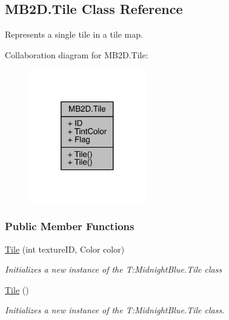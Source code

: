 \hypertarget{class_m_b2_d_1_1_tile}{}\subsection{M\+B2\+D.\+Tile Class Reference}
\label{class_m_b2_d_1_1_tile}


Represents a single tile in a tile map.  




Collaboration diagram for M\+B2\+D.\+Tile\+:
\nopagebreak
\begin{figure}[H]
\begin{center}
\leavevmode
\includegraphics[width=145pt]{class_m_b2_d_1_1_tile__coll__graph}
\end{center}
\end{figure}
\subsubsection*{Public Member Functions}
\begin{DoxyCompactItemize}
\item 
\hyperlink{class_m_b2_d_1_1_tile_ab9e2260dc2c752c36a248660d99b0e34}{Tile} (int texture\+ID, Color color)
\begin{DoxyCompactList}\small\item\em Initializes a new instance of the T\+:\+Midnight\+Blue.\+Tile class \end{DoxyCompactList}\item 
\hyperlink{class_m_b2_d_1_1_tile_a9bd9f08b191b87916f209ac7b9ce989c}{Tile} ()
\begin{DoxyCompactList}\small\item\em Initializes a new instance of the T\+:\+Midnight\+Blue.\+Tile class. \end{DoxyCompactList}\end{DoxyCompactItemize}
